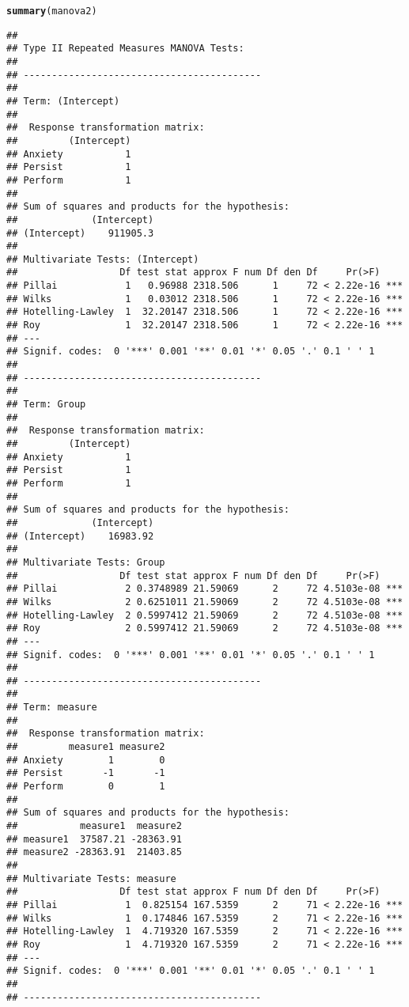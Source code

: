 \documentclass{article}\usepackage[]{graphicx}\usepackage[]{color}
\makeatletter
\newcommand{\hlstd}[1]{\textcolor[rgb]{0.345,0.345,0.345}{#1}}%
\newcommand{\hlkwd}[1]{\textcolor[rgb]{0.737,0.353,0.396}{\textbf{#1}}}%
\newenvironment{kframe}{%
 \def\at@end@of@kframe{}%
 \ifinner\ifhmode%
  \def\at@end@of@kframe{\end{minipage}}%
  \begin{minipage}{\columnwidth}%
 \fi\fi%
 \def\FrameCommand##1{\hskip\@totalleftmargin \hskip-\fboxsep
 \colorbox{shadecolor}{##1}\hskip-\fboxsep
     \hskip-\linewidth \hskip-\@totalleftmargin \hskip\columnwidth}%
 \MakeFramed {\advance\hsize-\width
   \@totalleftmargin\z@ \linewidth\hsize
   \@setminipage}}%
 {\par\unskip\endMakeFramed%
 \at@end@of@kframe}
\newenvironment{knitrout}{}{} %
\makeatother
\begin{document}
\begin{knitrout}
\begin{kframe}
\begin{alltt}
\hlkwd{summary}\hlstd{(manova2)}
\end{alltt}
\begin{verbatim}
## 
## Type II Repeated Measures MANOVA Tests:
## 
## ------------------------------------------
##  
## Term: (Intercept) 
## 
##  Response transformation matrix:
##         (Intercept)
## Anxiety           1
## Persist           1
## Perform           1
## 
## Sum of squares and products for the hypothesis:
##             (Intercept)
## (Intercept)    911905.3
## 
## Multivariate Tests: (Intercept)
##                  Df test stat approx F num Df den Df     Pr(>F)    
## Pillai            1   0.96988 2318.506      1     72 < 2.22e-16 ***
## Wilks             1   0.03012 2318.506      1     72 < 2.22e-16 ***
## Hotelling-Lawley  1  32.20147 2318.506      1     72 < 2.22e-16 ***
## Roy               1  32.20147 2318.506      1     72 < 2.22e-16 ***
## ---
## Signif. codes:  0 '***' 0.001 '**' 0.01 '*' 0.05 '.' 0.1 ' ' 1
## 
## ------------------------------------------
##  
## Term: Group 
## 
##  Response transformation matrix:
##         (Intercept)
## Anxiety           1
## Persist           1
## Perform           1
## 
## Sum of squares and products for the hypothesis:
##             (Intercept)
## (Intercept)    16983.92
## 
## Multivariate Tests: Group
##                  Df test stat approx F num Df den Df     Pr(>F)    
## Pillai            2 0.3748989 21.59069      2     72 4.5103e-08 ***
## Wilks             2 0.6251011 21.59069      2     72 4.5103e-08 ***
## Hotelling-Lawley  2 0.5997412 21.59069      2     72 4.5103e-08 ***
## Roy               2 0.5997412 21.59069      2     72 4.5103e-08 ***
## ---
## Signif. codes:  0 '***' 0.001 '**' 0.01 '*' 0.05 '.' 0.1 ' ' 1
## 
## ------------------------------------------
##  
## Term: measure 
## 
##  Response transformation matrix:
##         measure1 measure2
## Anxiety        1        0
## Persist       -1       -1
## Perform        0        1
## 
## Sum of squares and products for the hypothesis:
##           measure1  measure2
## measure1  37587.21 -28363.91
## measure2 -28363.91  21403.85
## 
## Multivariate Tests: measure
##                  Df test stat approx F num Df den Df     Pr(>F)    
## Pillai            1  0.825154 167.5359      2     71 < 2.22e-16 ***
## Wilks             1  0.174846 167.5359      2     71 < 2.22e-16 ***
## Hotelling-Lawley  1  4.719320 167.5359      2     71 < 2.22e-16 ***
## Roy               1  4.719320 167.5359      2     71 < 2.22e-16 ***
## ---
## Signif. codes:  0 '***' 0.001 '**' 0.01 '*' 0.05 '.' 0.1 ' ' 1
## 
## ------------------------------------------

\end{verbatim}
\end{kframe}
\end{knitrout}
\end{document}
